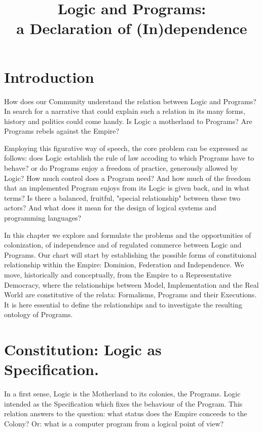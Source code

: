 \documentclass[]{article}
\title{Logic and Programs:\\
	 a Declaration of (In)dependence}
\author{}
\date{}
\begin{document}
\tableofcontents
\maketitle

%



\section{Introduction}
How does our Community understand the relation between Logic and Programs? In search for a narrative that could explain such a relation in its many forms, history and politics could come handy. Is Logic a motherland to Programs? Are Programs rebels against the Empire?

Employing this figurative way of speech, the core problem can be expressed as follows: does Logic establish the rule of law accoding to which Programs have to behave? or do Programs enjoy a freedom of practice, generously allowed by Logic? How much control does a Program need? And how much of the freedom that an implemented Program enjoys from its Logic is given back, and in what terms? Is there a balanced, fruitful, "special relationship" between these two actors? And what does it mean for the design of logical systems and programming languages?

In this chapter we explore and formulate the problems and the opportunities of colonization, of independence and of regulated commerce between Logic and Programs. Our chart will start by establishing the possible forms of constituional relationship within the Empire: Dominion, Federation and Independence. We move, historically and conceptually, from the Empire to a Representative Democracy, where the relationships between Model, Implementation and the Real World are constitutive of the relata: Formalisms, Programs and their Executions. It is here essential to define the relationships and to investigate the resulting ontology of Programs. 


\section{Constitution: Logic as Specification.}

In a first sense, Logic is the Motherland to its colonies, the Programs. Logic intended as the Specification which fixes the behaviour of the Program. This relation answers to the question: what status does the Empire conceeds to the Colony? Or: what is a computer program from a logical point of view?
\end{document}
